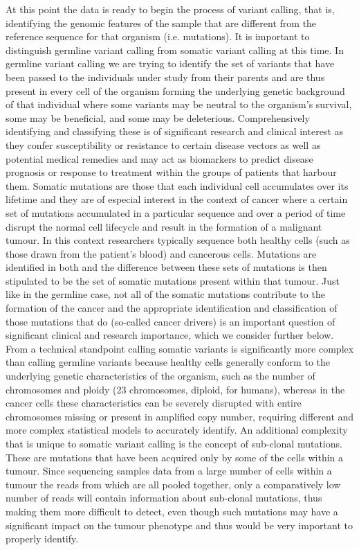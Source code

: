 At this point the data is ready to begin the process of variant calling, that is, identifying the genomic features of the sample that are different from the reference sequence for that organism (i.e. mutations). It is important to distinguish germline variant calling from somatic variant calling at this time. In germline variant calling we are trying to identify the set of variants that have been passed to the individuals under study from their parents and are thus present in every cell of the organism forming the underlying genetic background of that individual where some variants may be neutral to the organism's survival, some may be beneficial, and some may be deleterious. Comprehensively identifying and classifying these is of significant research and clinical interest as they confer susceptibility or resistance to certain disease vectors as well as potential medical remedies and may act as biomarkers to predict disease prognosis or response to treatment within the groups of patients that harbour them\autocite{wood2014whole}.
\clearpage 
Somatic mutations are those that each individual cell accumulates over its lifetime and they are of especial interest in the context of cancer where a certain set of mutations accumulated in a particular sequence and over a period of time disrupt the normal cell lifecycle and result in the formation of a malignant tumour\autocite{pereira2016somatic}. In this context researchers typically sequence both healthy cells (such as those drawn from the patient's blood) and cancerous cells. Mutations are identified in both and the difference between these sets of mutations is then stipulated to be the set of somatic mutations present within that tumour. Just like in the germline case, not all of the somatic mutations contribute to the formation of the cancer and the appropriate identification and classification of those mutations that do (so-called cancer drivers) is an important question of significant clinical and research importance, which we consider further below\autocite{greenman2007patterns}. From a technical standpoint calling somatic variants is significantly more complex than calling germline variants because healthy cells generally conform to the underlying genetic characteristics of the organism, such as the number of chromosomes and ploidy (23 chromosomes, diploid, for humans), whereas in the cancer cells these characteristics can be severely disrupted with entire chromosomes missing or present in amplified copy number, requiring different and more complex statistical models to accurately identify. An additional complexity that is unique to somatic variant calling is the concept of sub-clonal mutations\autocite{cibulskis2013sensitive}. These are mutations that have been acquired only by some of the cells within a tumour. Since sequencing samples data from a large number of cells within a tumour the reads from which are all pooled together, only a comparatively low number of reads will contain information about sub-clonal mutations, thus making them more difficult to detect, even though such mutations may have a significant impact on the tumour phenotype and thus would be very important to properly identify.

